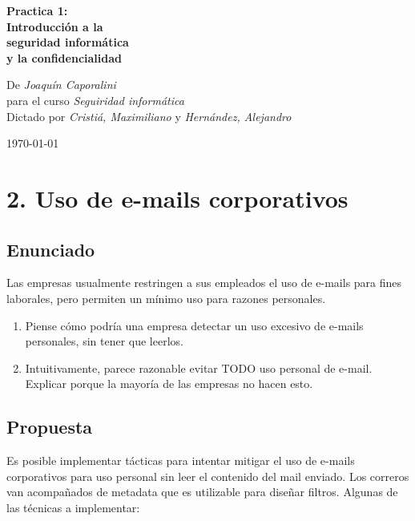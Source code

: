 \documentclass[11pt]{article}
\begin{document}
\thispagestyle{plain}
\begin{spacing}{2.0}
\noindent\textbf{\Huge 
    Practica 1:\\ Introducción a la\\ seguridad informática\\ y la confidencialidad
}
\end{spacing}

\begin{multicols}{2}
    \begin{flushleft}
        De \textit{Joaquín Caporalini}\\ para el curso \textit{Seguiridad informática}\\
        Dictado por \textit{Cristiá, Maximiliano} y \textit{Hernández, Alejandro}
    \end{flushleft}
    \columnbreak
    \begin{flushright}
        \today
    \end{flushright}
\end{multicols}


\section*{2. Uso de e-mails corporativos}
\subsection*{Enunciado}

Las empresas usualmente restringen a sus empleados el uso de e-mails para fines laborales, pero permiten un mínimo uso para razones personales.

\begin{enumerate}
    \item Piense cómo podría una empresa detectar un uso excesivo de e-mails personales, sin tener que leerlos.
    \item Intuitivamente, parece razonable evitar TODO uso personal de e-mail. Explicar porque la mayoría de las empresas no hacen esto.
\end{enumerate}

\subsection*{Propuesta}

Es posible implementar tácticas para intentar mitigar el uso de e-mails corporativos para uso personal sin leer el contenido del mail enviado. Los correros van acompañados de metadata que es utilizable para diseñar filtros. Algunas de las técnicas a implementar:
\end{document}
